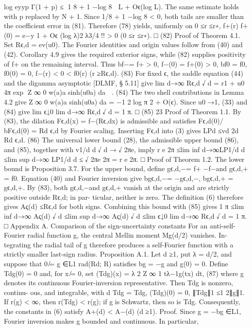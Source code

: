 log
eyyp
Γ(1 + p) ≤
1
8 + 1 −log 8

L + Oϵ(log L).
The same estimate holds with p replaced by N + 1. Since 1/8 + 1 −log 8 < 0, both tails are
smaller than the coeﬃcient error in (81). Therefore (78) yields, uniformly on 0 ≤r ≤r∗,
f+(r)
f+(0) = e−y
1 + Oϵ
(log λ)2
λ3/4
!!
> 0
(0 ≤r ≤r∗).
□
(82)
Proof of Theorem 4.1. Set Rϵ,d = ev(u0). The Fourier identities and origin values follow from
(40) and (42). Corollary 4.9 gives the required exterior signs, while (82) supplies positivity of
f+ on the remaining interval. Thus
bf−= f+ > 0,
f−(0) = f+(0) > 0,
bf0 = f0,
f0(0) = 0,
f−(r) < 0 < f0(r)
(r ≥Rϵ,d).
(83)
For ﬁxed ϵ, the saddle equation (44) and the digamma asymptotic [DLMF, § 5.11] give
lim
d→∞
Rϵ,d
√
d
=
r1 + u0
4π
exp
Z ∞
0
w(a)a sinh(u0a) da

.
(84)
The two shell contributions in Lemma 4.2 give
Z ∞
0
w(a)a sinh(u0a) da = −1
2 log π
2 + O(ϵ).
Since u0 →1, (33) and (84) give
lim
ϵ↓0 lim
d→∞
Rϵ,d
√
d
= 1
π.
□
(85)
23
Proof of Theorem 1.1. By (83), the dilation Fϵ,d(x) = f−(Rϵ,dx) is admissible and satisﬁes
Fϵ,d(0)/ bFϵ,d(0) = Rd
ϵ,d by Fourier scaling. Inserting Fϵ,d into (3) gives
LPd ≤vd
2d Rd
ϵ,d.
(86)
The universal lower bound (28), the admissible upper bound (86), and (85), together with
v1/d
d
√
d →
√
2πe, imply
r e
2π ≤lim inf
d→∞LP1/d
d
≤lim sup
d→∞
LP1/d
d
≤
√
2πe
2π
=
r e
2π.
□
Proof of Theorem 1.2. The lower bound is Proposition 3.7. For the upper bound, deﬁne gϵ,d,−=
f+ −f−and gϵ,d,+ = f0. Equation (40) and Fourier inversion give
bgϵ,d,−= −gϵ,d,−,
bgϵ,d,+ = gϵ,d,+.
By (83), both gϵ,d,−and gϵ,d,+ vanish at the origin and are strictly positive outside Rϵ,d; in par-
ticular, neither is zero. The deﬁnition (6) therefore gives Aς(d) ≤Rϵ,d for both signs. Combining
this bound with (85) gives
1
π ≤lim inf
d→∞
Aς(d)
√
d
≤lim sup
d→∞
Aς(d)
√
d
≤lim
ϵ↓0 lim
d→∞
Rϵ,d
√
d
= 1
π.
□
Appendix A. Comparison of the sign-uncertainty constants
For an anti-self-Fourier radial function g, the central Mellin moment Mg(d/2) vanishes. In-
tegrating the radial tail of g therefore produces a self-Fourier function with a strictly smaller
last-sign radius.
Proposition A.1. Let d ≥1, put λ = d/2, and suppose that 0 ̸= g ∈L1
rad(Rd; R) satisﬁes
bg = −g and g(0) = 0. Deﬁne Tdg(0) = 0 and, for x ̸= 0, set
(Tdg)(x) = λ
2
Z ∞
1
tλ−1g(tx) dt,
(87)
where g denotes its continuous Fourier-inversion representative. Then Tdg is nonzero, continu-
ous, and integrable, with
d
Tdg = Tdg,
(Tdg)(0) = 0,
∥Tdg∥1 ≤1
2∥g∥1.
If r(g) < ∞, then r(Tdg) < r(g); if g is Schwartz, then so is Tdg. Consequently, the constants
in (6) satisfy
A+(d) < A−(d)
(d ≥1).
Proof. Since g = −bg ∈L1, Fourier inversion makes g bounded and continuous. In particular,
